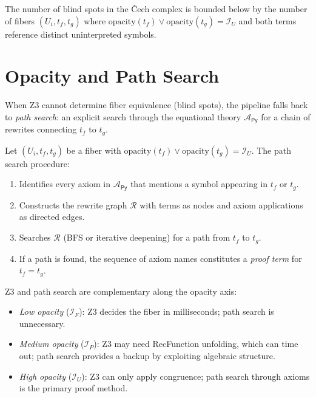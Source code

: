 \begin{corollary}
\label{cor:opacity-blind}
The number of blind spots in the \v{C}ech complex is bounded below by
the number of fibers $(U_i, t_f, t_g)$ where
$\mathrm{opacity}(t_f) \vee \mathrm{opacity}(t_g) = \mathcal{I}_U$
and both terms reference distinct uninterpreted symbols.
\end{corollary}


\section{Opacity and Path Search}
\label{sec:opacity-path}

When Z3 cannot determine fiber equivalence (blind spots), the
pipeline falls back to \emph{path search}: an explicit search
through the equational theory $\mathcal{A}_{\mathsf{Py}}$ for
a chain of rewrites connecting $t_f$ to $t_g$.

\begin{definition}
\label{def:opacity-path}
Let $(U_i, t_f, t_g)$ be a fiber with
$\mathrm{opacity}(t_f) \vee \mathrm{opacity}(t_g) = \mathcal{I}_U$.
The path search procedure:
\begin{enumerate}
  \item Identifies every axiom in $\mathcal{A}_{\mathsf{Py}}$ that
    mentions a symbol appearing in $t_f$ or $t_g$.
  \item Constructs the rewrite graph $\mathcal{R}$ with terms as
    nodes and axiom applications as directed edges.
  \item Searches $\mathcal{R}$ (BFS or iterative deepening) for a
    path from $t_f$ to $t_g$.
  \item If a path is found, the sequence of axiom names constitutes
    a \emph{proof term} for $t_f = t_g$.
\end{enumerate}
\end{definition}

\begin{proposition}[Complementarity]
\label{prop:complementarity}
Z3 and path search are complementary along the opacity axis:
\begin{itemize}
  \item \emph{Low opacity} ($\mathcal{I}_F$): Z3 decides the fiber
    in milliseconds; path search is unnecessary.
  \item \emph{Medium opacity} ($\mathcal{I}_P$): Z3 may need
    RecFunction unfolding, which can time out; path search provides
    a backup by exploiting algebraic structure.
  \item \emph{High opacity} ($\mathcal{I}_U$): Z3 can only apply
    congruence; path search through axioms is the primary proof
    method.
\end{itemize}
\end{proposition}


